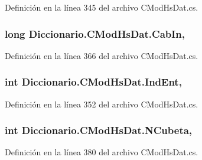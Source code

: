 Definición en la línea 345 del archivo C\-Mod\-Hs\-Dat.\-cs.

\hypertarget{class_diccionario_1_1_c_mod_hs_dat_a8e18bc5eb317b212efdb11d3bb874986}{
\subsubsection[{Cab\-In}]{\setlength{\rightskip}{0pt plus 5cm}long Diccionario.\-C\-Mod\-Hs\-Dat.\-Cab\-In\hspace{0.3cm}{\ttfamily [get]}, {\ttfamily [set]}}}\label{class_diccionario_1_1_c_mod_hs_dat_a8e18bc5eb317b212efdb11d3bb874986}


Definición en la línea 366 del archivo C\-Mod\-Hs\-Dat.\-cs.

\hypertarget{class_diccionario_1_1_c_mod_hs_dat_a38f0a77d02a4dacfd0519122d244e318}{
\subsubsection[{Ind\-Ent}]{\setlength{\rightskip}{0pt plus 5cm}int Diccionario.\-C\-Mod\-Hs\-Dat.\-Ind\-Ent\hspace{0.3cm}{\ttfamily [get]}, {\ttfamily [set]}}}\label{class_diccionario_1_1_c_mod_hs_dat_a38f0a77d02a4dacfd0519122d244e318}


Definición en la línea 352 del archivo C\-Mod\-Hs\-Dat.\-cs.

\hypertarget{class_diccionario_1_1_c_mod_hs_dat_a5b97a38442b0632e09337756e0ae2ec5}{
\subsubsection[{N\-Cubeta}]{\setlength{\rightskip}{0pt plus 5cm}int Diccionario.\-C\-Mod\-Hs\-Dat.\-N\-Cubeta\hspace{0.3cm}{\ttfamily [get]}, {\ttfamily [set]}}}\label{class_diccionario_1_1_c_mod_hs_dat_a5b97a38442b0632e09337756e0ae2ec5}


Definición en la línea 380 del archivo C\-Mod\-Hs\-Dat.\-cs.

